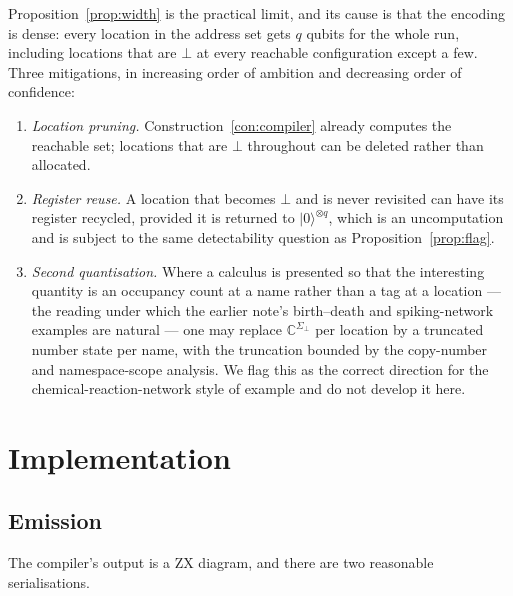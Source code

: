 \documentclass[11pt]{article}
\theoremstyle{definition}
\theoremstyle{plain}
\newcommand{\Tags}{\Sigma}
\newcommand{\Tagsb}{\Tags_{\bot}}
\newcommand{\ket}[1]{| #1 \rangle}
\begin{document}
Proposition~\ref{prop:width} is the practical limit, and its cause is that the encoding is dense:
every location in the address set gets $q$ qubits for the whole run, including locations that are
$\bot$ at every reachable configuration except a few. Three mitigations, in increasing order of
ambition and decreasing order of confidence:

\begin{enumerate}[leftmargin=*]
  \item \emph{Location pruning.} Construction~\ref{con:compiler} already computes the reachable
        set; locations that are $\bot$ throughout can be deleted rather than allocated.
  \item \emph{Register reuse.} A location that becomes $\bot$ and is never revisited can have its
        register recycled, provided it is returned to $\ket{0}^{\otimes q}$, which is an
        uncomputation and is subject to the same detectability question as
        Proposition~\ref{prop:flag}.
  \item \emph{Second quantisation.} Where a calculus is presented so that the interesting
        quantity is an occupancy count at a name rather than a tag at a location --- the reading
        under which the earlier note's birth--death and spiking-network examples are natural ---
        one may replace $\mathbb{C}^{\Tagsb}$ per location by a truncated number state per name,
        with the truncation bounded by the copy-number and namespace-scope analysis. We flag this
        as the correct direction for the chemical-reaction-network style of example and do not
        develop it here.
\end{enumerate}

\section{Implementation}\label{sec:impl}

\subsection{Emission}

The compiler's output is a ZX diagram, and there are two reasonable serialisations.
\end{document}
